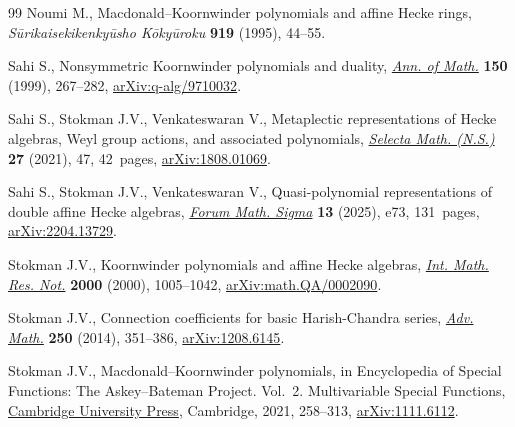 \documentclass[11pt]{article}
\numberwithin{equation}{section}
\numberwithin{equation}{section}
\begin{document}
\begin{thebibliography}{99}
Noumi M., Macdonald--{K}oornwinder polynomials and affine {H}ecke rings,
 \textit{S\=urikaisekikenky\=usho K\={o}ky\=uroku} \textbf{919} (1995),
 44--55.

Sahi S., Nonsymmetric {K}oornwinder polynomials and duality,
 \href{https://doi.org/10.2307/121102}{\textit{Ann. of Math.}} \textbf{150}
 (1999), 267--282,
 \href{http://arxiv.org/abs/q-alg/9710032}{arXiv:q-alg/9710032}.

Sahi S., Stokman J.V., Venkateswaran V., Metaplectic representations of {H}ecke
 algebras, {W}eyl group actions, and associated polynomials,
 \href{https://doi.org/10.1007/s00029-021-00654-1}{\textit{Selecta Math.
 (N.S.)}} \textbf{27} (2021), 47, 42~pages,
 \href{http://arxiv.org/abs/1808.01069}{arXiv:1808.01069}.

Sahi S., Stokman J.V., Venkateswaran V., Quasi-polynomial representations of
 double affine {H}ecke algebras,
 \href{https://doi.org/10.1017/fms.2025.33}{\textit{Forum Math. Sigma}}
 \textbf{13} (2025), e73, 131~pages,
 \href{http://arxiv.org/abs/2204.13729}{arXiv:2204.13729}.


Stokman J.V., Koornwinder polynomials and affine {H}ecke algebras,
 \href{https://doi.org/10.1155/S1073792800000520}{\textit{Int. Math. Res.
 Not.}} \textbf{2000} (2000), 1005--1042,
 \href{http://arxiv.org/abs/math.QA/0002090}{arXiv:math.QA/0002090}.

Stokman J.V., Connection coefficients for basic {H}arish-{C}handra series,
 \href{https://doi.org/10.1016/j.aim.2013.09.016}{\textit{Adv. Math.}}
 \textbf{250} (2014), 351--386,
 \href{http://arxiv.org/abs/1208.6145}{arXiv:1208.6145}.

Stokman J.V., Macdonald--{K}oornwinder polynomials, in Encyclopedia of Special
 Functions: {T}he {A}skey--{B}ateman Project. {V}ol.~2. {M}ultivariable
 Special Functions, \href{https://doi.org/10.1017/9780511777165.010}{Cambridge
 University Press}, Cambridge, 2021, 258--313,
 \href{http://arxiv.org/abs/1111.6112}{arXiv:1111.6112}.

\end{thebibliography}
\end{document}
